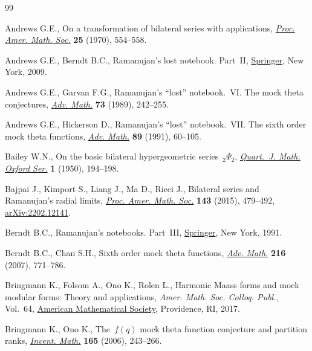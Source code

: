 \documentclass[10pt,a4paper]{amsart}
\numberwithin{equation}{section}
\begin{document}
\begin{thebibliography}{99}
\footnotesize\itemsep=0pt

Andrews G.E., On a transformation of bilateral series with applications,
  \href{https://doi.org/10.2307/2036642}{\textit{Proc. Amer. Math. Soc.}}
  \textbf{25} (1970), 554--558.

Andrews G.E., Berndt B.C., Ramanujan's lost notebook. {P}art~{II},
  \href{https://doi.org/10.1007/b13290}{Springer}, New York, 2009.

Andrews G.E., Garvan F.G., Ramanujan's ``lost'' notebook.~{VI}. {T}he mock
  theta conjectures,
  \href{https://doi.org/10.1016/0001-8708(89)90070-4}{\textit{Adv. Math.}}
  \textbf{73} (1989), 242--255.

Andrews G.E., Hickerson D., Ramanujan's ``lost'' notebook.~{VII}. {T}he sixth
  order mock theta functions,
  \href{https://doi.org/10.1016/0001-8708(91)90083-J}{\textit{Adv. Math.}}
  \textbf{89} (1991), 60--105.

Bailey W.N., On the basic bilateral hypergeometric series~{${}_2\Psi_2$},
  \href{https://doi.org/10.1093/qmath/1.1.194}{\textit{Quart.~J. Math. Oxford
  Ser.}} \textbf{1} (1950), 194--198.

Bajpai J., Kimport S., Liang J., Ma D., Ricci J., Bilateral series and
  {R}amanujan's radial limits,
  \href{https://doi.org/10.1090/S0002-9939-2014-12249-0}{\textit{Proc. Amer.
  Math. Soc.}} \textbf{143} (2015), 479--492,
  \href{http://arxiv.org/abs/2202.12141}{arXiv:2202.12141}.

Berndt B.C., Ramanujan's notebooks. {P}art~{III},
  \href{https://doi.org/10.1007/978-1-4612-0965-2}{Springer}, New York, 1991.

Berndt B.C., Chan S.H., Sixth order mock theta functions,
  \href{https://doi.org/10.1016/j.aim.2007.06.004}{\textit{Adv. Math.}}
  \textbf{216} (2007), 771--786.

Bringmann K., Folsom A., Ono K., Rolen L., Harmonic {M}aass forms and mock
  modular forms: {T}heory and applications, \textit{Amer. Math. Soc. Colloq.
  Publ.}, Vol.~64, \href{https://doi.org/10.1090/coll/064}{American
  Mathematical Society}, Providence, RI, 2017.

Bringmann K., Ono K., The~{$f(q)$} mock theta function conjecture and partition
  ranks, \href{https://doi.org/10.1007/s00222-005-0493-5}{\textit{Invent.
  Math.}} \textbf{165} (2006), 243--266.


\end{thebibliography}
\end{document}
